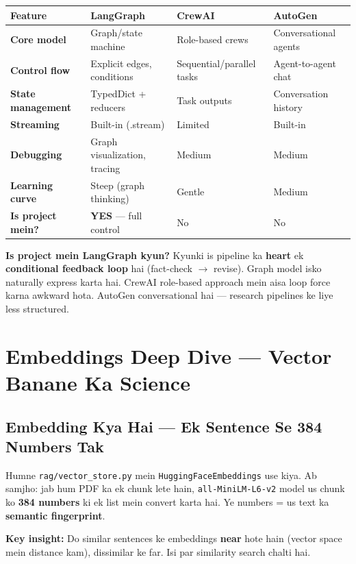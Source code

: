 \begin{longtable}{p{3.2cm} p{3.4cm} p{3.4cm} p{3.4cm}}
\toprule
\textbf{Feature} & \textbf{LangGraph} & \textbf{CrewAI} & \textbf{AutoGen} \\
\midrule
\textbf{Core model} & Graph/state machine & Role-based crews & Conversational agents \\
\textbf{Control flow} & Explicit edges, conditions & Sequential/parallel tasks & Agent-to-agent chat \\
\textbf{State management} & TypedDict + reducers & Task outputs & Conversation history \\
\textbf{Streaming} & Built-in (.stream) & Limited & Built-in \\
\textbf{Debugging} & Graph visualization, tracing & Medium & Medium \\
\textbf{Learning curve} & Steep (graph thinking) & Gentle & Medium \\
\textbf{Is project mein?} & \textbf{YES} --- full control & No & No \\
\bottomrule
\end{longtable}

\begin{conceptbox}
\textbf{Is project mein LangGraph kyun?} Kyunki is pipeline ka \textbf{heart} ek \textbf{conditional feedback loop} hai (fact-check $\rightarrow$ revise). Graph model isko naturally express karta hai. CrewAI role-based approach mein aisa loop force karna awkward hota. AutoGen conversational hai --- research pipelines ke liye less structured.
\end{conceptbox}

\section{Embeddings Deep Dive --- Vector Banane Ka Science}

\subsection{Embedding Kya Hai --- Ek Sentence Se 384 Numbers Tak}

\begin{storybox}
Humne \texttt{rag/vector\_store.py} mein \texttt{HuggingFaceEmbeddings} use kiya. Ab samjho: jab hum PDF ka ek chunk lete hain, \texttt{all-MiniLM-L6-v2} model us chunk ko \textbf{384 numbers} ki ek list mein convert karta hai. Ye numbers = us text ka \textbf{semantic fingerprint}.

\textbf{Key insight:} Do similar sentences ke embeddings \textbf{near} hote hain (vector space mein distance kam), dissimilar ke far. Isi par similarity search chalti hai.
\end{storybox}

